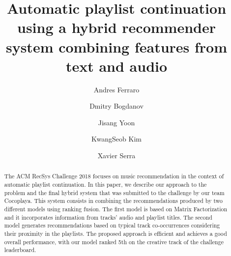 \documentclass[sigconf]{acmart}
\begin{document}
\title[APC using a hybrid system combining features from text and audio]{Automatic playlist continuation using a hybrid recommender system combining features from text and audio}



\author{Andres Ferraro}

\author{Dmitry Bogdanov}

\author{Jisang Yoon}

\author{KwangSeob Kim}

\author{Xavier Serra}

\renewcommand{\shortauthors}{A. Ferraro et al.}


\begin{abstract}
The ACM RecSys Challenge 2018 focuses on music recommendation in the context of automatic playlist continuation. In this paper, we describe our approach to the problem and the final hybrid system that was submitted to the challenge by our team Cocoplaya. This system consists in combining the recommendations produced by two different models using ranking fusion. The first model is based on Matrix Factorization and it incorporates information from tracks' audio and playlist titles. The second model generates recommendations based on typical track co-occurrences considering their proximity in the playlists. The proposed approach is efficient and achieves a good overall performance, with our model ranked 5th on the creative track of the challenge leaderboard.
%
\end{abstract}
\end{document}
